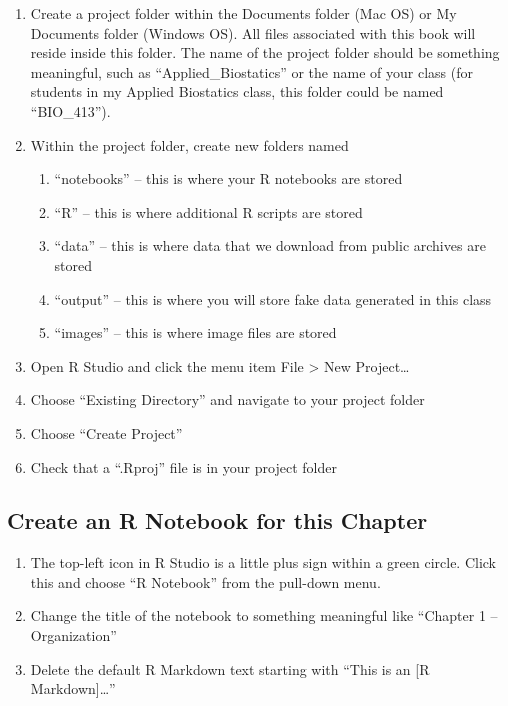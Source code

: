 \documentclass[]{book}
\providecommand{\tightlist}{%
  \setlength{\itemsep}{0pt}\setlength{\parskip}{0pt}}
\begin{document}
\begin{enumerate}
\def\labelenumi{\arabic{enumi}.}
\tightlist
\item
  Create a project folder within the Documents folder (Mac OS) or My Documents folder (Windows OS). All files associated with this book will reside inside this folder. The name of the project folder should be something meaningful, such as ``Applied\_Biostatics'' or the name of your class (for students in my Applied Biostatics class, this folder could be named ``BIO\_413'').
\item
  Within the project folder, create new folders named

  \begin{enumerate}
  \def\labelenumii{\arabic{enumii}.}
  \tightlist
  \item
    ``notebooks'' -- this is where your R notebooks are stored
  \item
    ``R'' -- this is where additional R scripts are stored
  \item
    ``data'' -- this is where data that we download from public archives are stored
  \item
    ``output'' -- this is where you will store fake data generated in this class
  \item
    ``images'' -- this is where image files are stored
  \end{enumerate}
\item
  Open R Studio and click the menu item File \textgreater{} New Project\ldots{}
\item
  Choose ``Existing Directory'' and navigate to your project folder
\item
  Choose ``Create Project''
\item
  Check that a ``.Rproj'' file is in your project folder
\end{enumerate}

\hypertarget{create-an-r-notebook-for-this-chapter}{%
\subsection{Create an R Notebook for this Chapter}\label{create-an-r-notebook-for-this-chapter}}

\begin{enumerate}
\def\labelenumi{\arabic{enumi}.}
\tightlist
\item
  The top-left icon in R Studio is a little plus sign within a green circle. Click this and choose ``R Notebook'' from the pull-down menu.
\item
  Change the title of the notebook to something meaningful like ``Chapter 1 -- Organization''
\item
  Delete the default R Markdown text starting with ``This is an {[}R Markdown{]}\ldots{}''
\end{enumerate}
\end{document}
